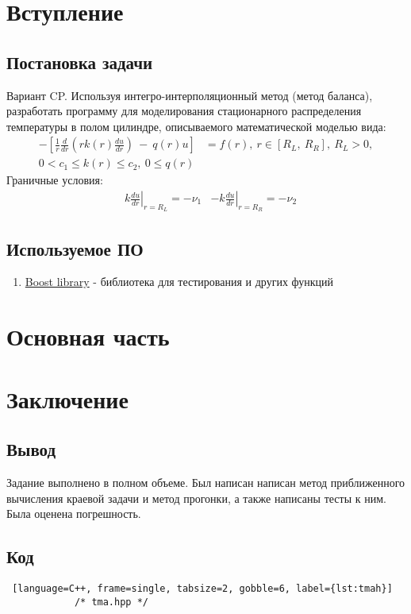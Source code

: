 \documentclass[a4paper,12pt]{article}
\begin{document}
	
	\newpage
	\tableofcontents
	\newpage

	\section{Вступление}
	\subsection{Постановка задачи}

	Вариант CP. Используя интегро-интерполяционный метод (метод баланса), разработать программу для моделирования стационарного распределения температуры в полом цилиндре, описываемого математической моделью вида:
	\begin{align*}
		-\left[ \frac{1}{r} \frac{d}{dr} \left(r k(r)\frac{du}{dr} \right)\ -\ q(r)u \right]
		&= f(r),\ r \in \left[ R_L,\ R_R\right],\ R_L > 0,
		\\
		 0 < c_1 \leq k(r) \leq c_2,\ 0 \leq q(r)&
	\end{align*}
	Граничные условия: \newline
	\begin{align*}
		&k \left. \frac{du}{dr}\right\vert_{r = R_L} = -\nu _1
		&-k \left. \frac{du}{dr}\right\vert_{r = R_R} = -\nu_2
	\end{align*}
	\subsection{Используемое ПО}

	\begin{enumerate}
		\item \href{https://www.boost.org/}{Boost library} - библиотека для тестирования и других функций
	\end{enumerate}
	\newpage

	\section{Основная часть}
	

	
	\newpage

	
	\newpage

	
	\newpage

	\section{Заключение}
	\subsection{Вывод}
	Задание выполнено в полном объеме.
	Был написан написан метод приближенного вычисления краевой задачи и метод прогонки, а также написаны тесты к ним.
	Была оценена погрешность.

	\subsection{Код}
	\begin{footnotesize}
		\begin{lstlisting} [language=C++, frame=single, tabsize=2, gobble=6, label={lst:tmah}]
			/* tma.hpp */
		\end{lstlisting}
	\end{footnotesize}
\end{document}
